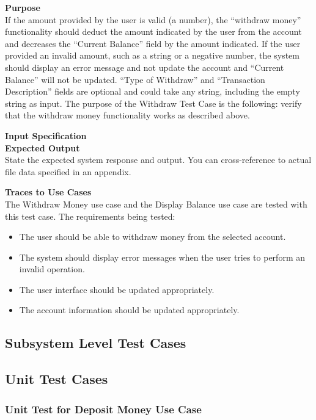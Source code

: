 \documentclass[12pt]{article}
\begin{document}
\noindent
{\bf Purpose}\\
If the amount provided by the user is valid (a number), the “withdraw money” functionality should deduct the amount indicated by the user from the account and decreases the “Current Balance” field by the amount indicated. If the user provided an invalid amount, such as a string or a negative number, the system should display an error message and not update the account and “Current Balance” will not be updated. “Type of Withdraw” and “Transaction Description” fields are optional and could take any string, including the empty string as input. The purpose of the Withdraw Test Case is the following: verify that the withdraw money functionality works as described above.


\noindent
{\bf Input Specification}\\









\noindent
{\bf Expected Output}\\
State the expected system response and output.
You can cross-reference to actual file data specified in an appendix.

\noindent
{\bf Traces to Use Cases}\\
The Withdraw Money use case and the Display Balance use case are tested with this test case. The requirements being tested:
\begin{itemize}
  \item The user should be able to withdraw money from the selected account.
  \item The system should display error messages when the user tries to perform an invalid operation.
  \item The user interface should be updated appropriately.
  \item The account information should be updated appropriately.
\end{itemize}

\subsection{Subsystem Level Test Cases}

\subsection{Unit Test Cases}

\subsubsection{Unit Test for Deposit Money Use Case}
\end{document}
